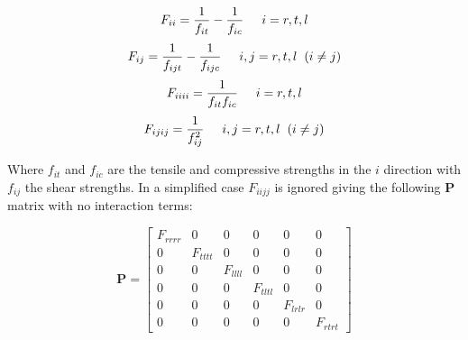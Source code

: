 \documentclass[10pt]{article}
\begin{document}
\begin{equation}\label{equ:F_vals1}
F_{ii} = \frac{1}{f_{it}}-\frac{1}{f_{ic}} \hspace{0.5cm} i = r,t,l\hspace{0.2cm}\\
\end{equation}
\begin{equation}\label{equ:F_vals2}
F_{ij} = \frac{1}{f_{ijt}}-\frac{1}{f_{ijc}} \hspace{0.5cm} i,j = r,t,l \hspace{0.2cm} (i\neq j)\hspace{0.2cm}\\
\end{equation}
\begin{equation}\label{equ:F_vals3}
F_{iiii} = \frac{1}{f_{it}f_{ic}} \hspace{0.5cm} i = r,t,l\hspace{0.2cm}\\
\end{equation}
\begin{equation}\label{equ:F_vals4}
F_{ijij} = \frac{1}{f_{ij}^2} \hspace{0.5cm} i,j = r,t,l \hspace{0.2cm} (i\neq j)
\end{equation}


Where \(f_{it}\) and \(f_{ic}\) are the tensile and compressive strengths in the \(i\) direction with \(f_{ij}\) the shear strengths.
In a simplified case  \(F_{iijj}\) is ignored giving the following \(\boldsymbol{P}\) matrix with no interaction terms:

\begin{equation}\label{equ:P_mat_k0}
\boldsymbol{P}=\begin{bmatrix}
	F_{rrrr}&0&0&0&0&0\\
	0&F_{tttt}&0&0&0&0\\
	0&0&F_{llll}&0&0&0\\
	0&0&0&F_{tltl}&0&0\\
	0&0&0&0&F_{lrlr}&0\\
	0&0&0&0&0&F_{rtrt}
	\end{bmatrix}
\end{equation}
\end{document}
